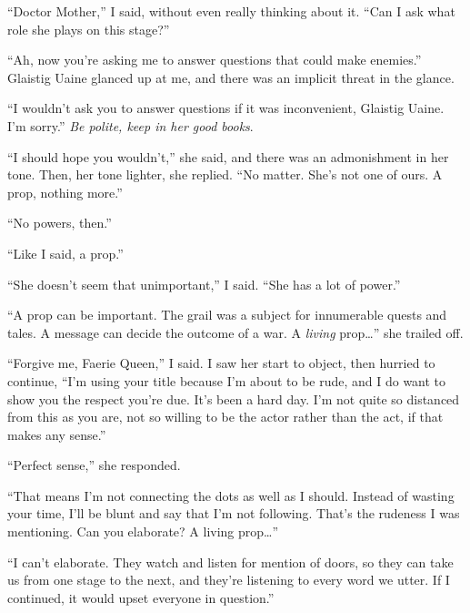 ``Doctor Mother,'' I said, without even really thinking about it.  ``Can I ask what role she plays on this stage?''



``Ah, now you're asking me to answer questions that could make enemies.''  Glaistig Uaine glanced up at me, and there was an implicit threat in the glance.



``I wouldn't ask you to answer questions if it was inconvenient, Glaistig Uaine.  I'm sorry.''  \emph{Be polite, keep in her good books}.



``I should hope you wouldn't,'' she said, and there was an admonishment in her tone.  Then, her tone lighter, she replied.  ``No matter.  She's not one of ours.  A prop, nothing more.''



``No powers, then.''



``Like I said, a prop.''



``She doesn't seem that unimportant,'' I said.  ``She has a lot of power.''



``A prop can be important.  The grail was a subject for innumerable quests and tales.  A message can decide the outcome of a war.  A \emph{living }prop\ldots''  she trailed off.



``Forgive me, Faerie Queen,'' I said.  I saw her start to object, then hurried to continue, ``I'm using your title because I'm about to be rude, and I do want to show you the respect you're due.  It's been a hard day.  I'm not quite so distanced from this as you are, not so willing to be the actor rather than the act, if that makes any sense.''



``Perfect sense,'' she responded.



``That means I'm not connecting the dots as well as I should.  Instead of wasting your time, I'll be blunt and say that I'm not following.  That's the rudeness I was mentioning.  Can you elaborate?  A living prop\ldots''



``I can't elaborate.  They watch and listen for mention of doors, so they can take us from one stage to the next, and they're listening to every word we utter.  If I continued, it would upset everyone in question.''



